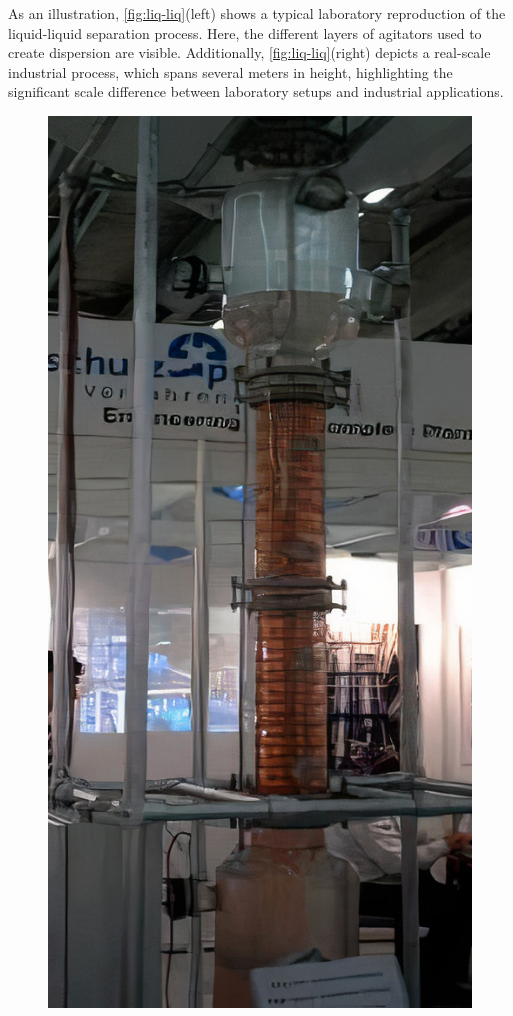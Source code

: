 As an illustration, \ref{fig:liq-liq}(left) shows a typical laboratory reproduction of the liquid-liquid separation process. 
Here, the different layers of agitators used to create dispersion are visible. 
Additionally, \ref{fig:liq-liq}(right) depicts a real-scale industrial process, which spans several meters in height, highlighting the significant scale difference between laboratory setups and industrial applications. 
\begin{figure}[h!]
    \centering
    \includegraphics[height=0.3\textheight]{image/liq-liq_LE_auto_x5.jpg}

\end{figure}
